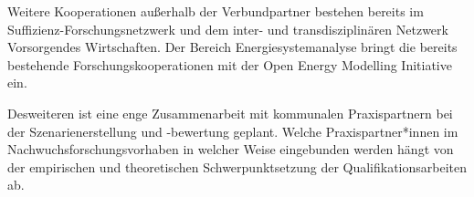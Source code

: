 \documentclass[a4paper,11pt,twoside]{scrartcl}
\begin{document}
Weitere Kooperationen außerhalb der Verbundpartner bestehen bereits im Suffizienz-Forschungsnetzwerk und dem inter- und transdisziplinären Netzwerk Vorsorgendes Wirtschaften. Der Bereich Energiesystemanalyse bringt die bereits bestehende Forschungskooperationen mit der Open Energy Modelling Initiative \cite{openmod} ein.

Desweiteren ist eine enge Zusammenarbeit mit kommunalen Praxispartnern bei der Szenarienerstellung und -bewertung geplant. Welche Praxispartner*innen im Nachwuchsforschungsvorhaben in welcher Weise eingebunden werden hängt von der empirischen und theoretischen Schwerpunktsetzung der Qualifikationsarbeiten ab.

\end{document}
